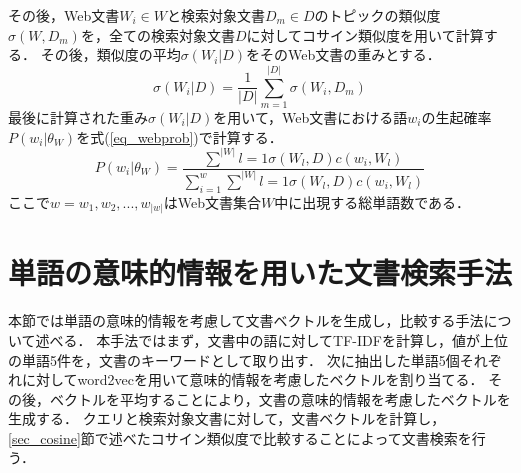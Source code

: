 その後，Web文書$W_i \in W$と検索対象文書$D_m \in D$のトピックの類似度$\sigma(W, D_m)$を，全ての検索対象文書$D$に対してコサイン類似度を用いて計算する．
その後，類似度の平均$\sigma(W_i | D)$をそのWeb文書の重みとする．
\begin{equation}
    \sigma(W_i | D) = \frac{1}{|D|}\sum^{|D|}_{m=1}\sigma(W_i, D_m) \label{eq_webweight}
\end{equation}
最後に計算された重み$\sigma(W_i | D)$を用いて，Web文書における語$w_i$の生起確率$P(w_i|\theta_W)$を式(\ref{eq_webprob})で計算する．
\begin{equation}
    P(w_i|\theta_W) = \frac{ \sum^{|W|}{l=1}\sigma(W_l, D)c(w_i, W_l) }{ \sum^{w}_{i=1} \sum^{|W|}{l=1}\sigma(W_l, D)c(w_i, W_l)}   \label{eq_webprob}
\end{equation}
ここで$w = {w_1, w_2, ..., w_|w|}$はWeb文書集合$W$中に出現する総単語数である．

\section{単語の意味的情報を用いた文書検索手法}  \label{sec_word2vec}
%
本節では単語の意味的情報を考慮して文書ベクトルを生成し，比較する手法について述べる．
本手法ではまず，文書中の語に対してTF-IDFを計算し，値が上位の単語5件を，文書のキーワードとして取り出す．
次に抽出した単語5個それぞれに対してword2vecを用いて意味的情報を考慮したベクトルを割り当てる．
その後，ベクトルを平均することにより，文書の意味的情報を考慮したベクトルを生成する．
クエリと検索対象文書に対して，文書ベクトルを計算し，\ref{sec_cosine}節で述べたコサイン類似度で比較することによって文書検索を行う．


